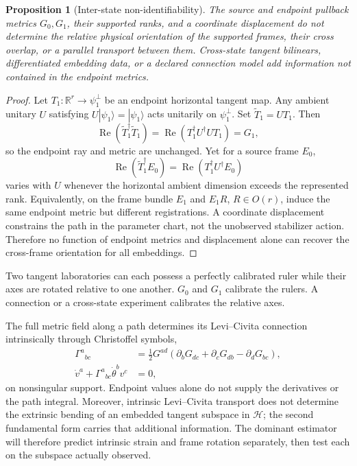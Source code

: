 \documentclass[10pt,twocolumn]{article}
\newtheorem{proposition}[theorem]{Proposition}
\theoremstyle{definition}
\theoremstyle{remark}
\newcommand{\R}{\mathbb R}
\newcommand{\Hh}{\mathcal H}
\newcommand{\Rea}{\operatorname{Re}}
\begin{document}
\begin{proposition}[Inter-state non-identifiability]
The source and endpoint pullback metrics $G_0,G_1$, their supported ranks, and a coordinate displacement do not determine the relative physical orientation of the supported frames, their cross overlap, or a parallel transport between them.  Cross-state tangent bilinears, differentiated embedding data, or a declared connection model add information not contained in the endpoint metrics.
\end{proposition}

\begin{proof}
Let $T_1:\R^r\to\psi_1^\perp$ be an endpoint horizontal tangent map.  Any ambient unitary $U$ satisfying $U|\psi_1\rangle=|\psi_1\rangle$ acts unitarily on $\psi_1^\perp$.  Set $\widetilde T_1=UT_1$.  Then
\begin{equation}
 \Rea(\widetilde T_1^\dagger\widetilde T_1)
 =\Rea(T_1^\dagger U^\dagger UT_1)=G_1,
 \label{eq:stabilizer}
\end{equation}
so the endpoint ray and metric are unchanged.  Yet for a source frame $E_0$,
\begin{equation}
 \Rea(\widetilde T_1^\dagger E_0)
 =\Rea(T_1^\dagger U^\dagger E_0)
 \label{eq:crosschanges}
\end{equation}
varies with $U$ whenever the horizontal ambient dimension exceeds the represented rank.  Equivalently, on the frame bundle $E_1$ and $E_1R$, $R\in O(r)$, induce the same endpoint metric but different registrations.  A coordinate displacement constrains the path in the parameter chart, not the unobserved stabilizer action.  Therefore no function of endpoint metrics and displacement alone can recover the cross-frame orientation for all embeddings.
\end{proof}

\begin{physbox}
Two tangent laboratories can each possess a perfectly calibrated ruler while their axes are rotated relative to one another.  $G_0$ and $G_1$ calibrate the rulers.  A connection or a cross-state experiment calibrates the relative axes.
\end{physbox}

The full metric field along a path determines its Levi--Civita connection intrinsically through Christoffel symbols,
\begin{align}
 \Gamma^a{}_{bc}
 &=\frac12G^{ad}
 (\partial_bG_{dc}+\partial_cG_{db}-\partial_dG_{bc}),\nonumber\\
 \dot v^a+\Gamma^a{}_{bc}\dot\theta^b v^c&=0,
 \label{eq:christoffel}
\end{align}
on nonsingular support.  Endpoint values alone do not supply the derivatives or the path integral.  Moreover, intrinsic Levi--Civita transport does not determine the extrinsic bending of an embedded tangent subspace in $\Hh$; the second fundamental form carries that additional information.  The dominant estimator will therefore predict intrinsic strain and frame rotation separately, then test each on the subspace actually observed.
\end{document}
